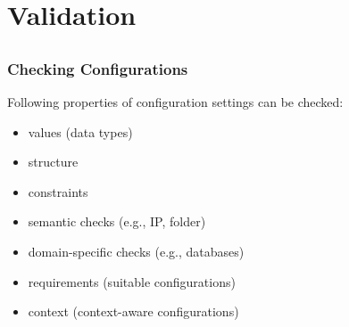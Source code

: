 \section{Validation}
\subsection{}

\begin{frame}
	\frametitle{Checking Configurations}

	Following properties of configuration settings can be checked:

	\begin{itemize}[<+-| alert@+>]
	\item values (data types)
	\item structure
	\item constraints
	\item semantic checks (e.g., IP, folder)
	\item domain-specific checks (e.g., databases)
	\item requirements (suitable configurations)
	\item context (context-aware configurations)
	\end{itemize}
\end{frame}


